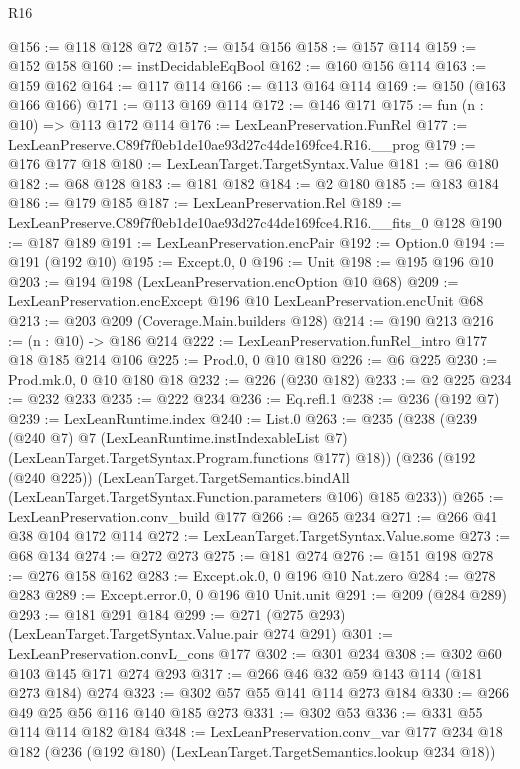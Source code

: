 \begin{lexlean}{R16}
\begin{coremodule}
@156 := @118 @128 @72
@157 := @154 @156
@158 := @157 @114
@159 := @152 @158
@160 := instDecidableEqBool
@162 := @160 @156 @114
@163 := @159 @162
@164 := @117 @114
@166 := @113 @164 @114
@169 := @150 (@163 @166 @166)
@171 := @113 @169 @114
@172 := @146 @171
@175 := fun (n : @10) => @113 @172 @114
@176 := LexLeanPreservation.FunRel
@177 := LexLeanPreserve.C89f7f0eb1de10ae93d27c44de169fce4.R16.__prog
@179 := @176 @177 @18
@180 := LexLeanTarget.TargetSyntax.Value
@181 := @6 @180
@182 := @68 @128
@183 := @181 @182
@184 := @2 @180
@185 := @183 @184
@186 := @179 @185
@187 := LexLeanPreservation.Rel
@189 := LexLeanPreserve.C89f7f0eb1de10ae93d27c44de169fce4.R16.__fits_0 @128
@190 := @187 @189
@191 := LexLeanPreservation.encPair
@192 := Option.{0}
@194 := @191 (@192 @10)
@195 := Except.{0, 0}
@196 := Unit
@198 := @195 @196 @10
@203 := @194 @198 (LexLeanPreservation.encOption @10 @68)
@209 := LexLeanPreservation.encExcept @196 @10 LexLeanPreservation.encUnit @68
@213 := @203 @209 (Coverage.Main.builders @128)
@214 := @190 @213
@216 := (n : @10) -> @186 @214
@222 := LexLeanPreservation.funRel_intro @177 @18 @185 @214 @106
@225 := Prod.{0, 0} @10 @180
@226 := @6 @225
@230 := Prod.mk.{0, 0} @10 @180 @18
@232 := @226 (@230 @182)
@233 := @2 @225
@234 := @232 @233
@235 := @222 @234
@236 := Eq.refl.{1}
@238 := @236 (@192 @7)
@239 := LexLeanRuntime.index
@240 := List.{0}
@263 := @235
    (@238
      (@239
        (@240 @7)
        @7
        (LexLeanRuntime.instIndexableList @7)
        (LexLeanTarget.TargetSyntax.Program.functions @177)
        @18))
    (@236
      (@192 (@240 @225))
      (LexLeanTarget.TargetSemantics.bindAll
        (LexLeanTarget.TargetSyntax.Function.parameters @106)
        @185
        @233))
@265 := LexLeanPreservation.conv_build @177
@266 := @265 @234
@271 := @266 @41 @38 @104 @172 @114
@272 := LexLeanTarget.TargetSyntax.Value.some
@273 := @68 @134
@274 := @272 @273
@275 := @181 @274
@276 := @151 @198
@278 := @276 @158 @162
@283 := Except.ok.{0, 0} @196 @10 Nat.zero
@284 := @278 @283
@289 := Except.error.{0, 0} @196 @10 Unit.unit
@291 := @209 (@284 @289)
@293 := @181 @291 @184
@299 := @271 (@275 @293) (LexLeanTarget.TargetSyntax.Value.pair @274 @291)
@301 := LexLeanPreservation.convL_cons @177
@302 := @301 @234
@308 := @302 @60 @103 @145 @171 @274 @293
@317 := @266 @46 @32 @59 @143 @114 (@181 @273 @184) @274
@323 := @302 @57 @55 @141 @114 @273 @184
@330 := @266 @49 @25 @56 @116 @140 @185 @273
@331 := @302 @53
@336 := @331 @55 @114 @114 @182 @184
@348 := LexLeanPreservation.conv_var
    @177
    @234
    @18
    @182
    (@236 (@192 @180) (LexLeanTarget.TargetSemantics.lookup @234 @18))

\end{coremodule}
\end{lexlean}
